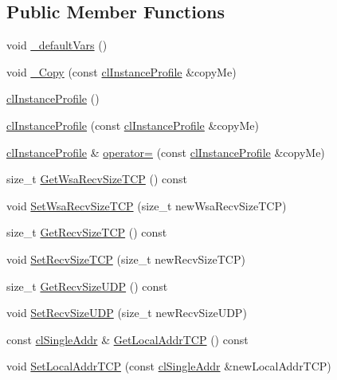 \subsection*{Public Member Functions}
\begin{DoxyCompactItemize}
\item 
void \hyperlink{classcl_instance_profile_a2ecfa88976bc706b93de3c8cd4e84304}{\_\-defaultVars} ()
\item 
void \hyperlink{classcl_instance_profile_a89402aa23ff4bebc52b24bf1b2a1f8bc}{\_\-Copy} (const \hyperlink{classcl_instance_profile}{clInstanceProfile} \&copyMe)
\item 
\hyperlink{classcl_instance_profile_ae3d0279975063e5888bc59ee4179e1d3}{clInstanceProfile} ()
\item 
\hyperlink{classcl_instance_profile_aa1bd09516ace6137f13e5d737ebc00e8}{clInstanceProfile} (const \hyperlink{classcl_instance_profile}{clInstanceProfile} \&copyMe)
\item 
\hyperlink{classcl_instance_profile}{clInstanceProfile} \& \hyperlink{classcl_instance_profile_a73cfd933accc2a8707f327fd20b7801e}{operator=} (const \hyperlink{classcl_instance_profile}{clInstanceProfile} \&copyMe)
\item 
size\_\-t \hyperlink{classcl_instance_profile_a27feb61200d554b90fabf4fc5ae8bd40}{GetWsaRecvSizeTCP} () const 
\item 
void \hyperlink{classcl_instance_profile_a00cc75f099d0da5fb4883e0920e16132}{SetWsaRecvSizeTCP} (size\_\-t newWsaRecvSizeTCP)
\item 
size\_\-t \hyperlink{classcl_instance_profile_a2cfd595788889760627327126a27369a}{GetRecvSizeTCP} () const 
\item 
void \hyperlink{classcl_instance_profile_aa74e1e3fa50552031c661f51265f7ba0}{SetRecvSizeTCP} (size\_\-t newRecvSizeTCP)
\item 
size\_\-t \hyperlink{classcl_instance_profile_a5c9a2d7ede755c313c80c52bc813c639}{GetRecvSizeUDP} () const 
\item 
void \hyperlink{classcl_instance_profile_a3d7917bd7a5098571bc9d4f906a713e4}{SetRecvSizeUDP} (size\_\-t newRecvSizeUDP)
\item 
const \hyperlink{classcl_single_addr}{clSingleAddr} \& \hyperlink{classcl_instance_profile_a6cd003b808312b99df2e3c3340930e06}{GetLocalAddrTCP} () const 
\item 
void \hyperlink{classcl_instance_profile_a0a633e7c2ce7c2ee63681995f9eae04d}{SetLocalAddrTCP} (const \hyperlink{classcl_single_addr}{clSingleAddr} \&newLocalAddrTCP)

\end{DoxyCompactItemize}
